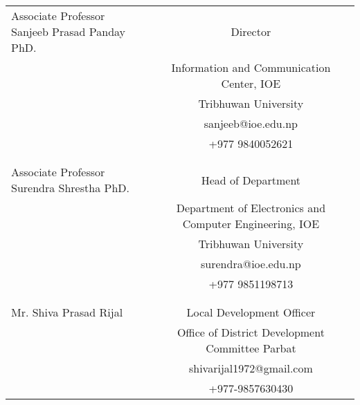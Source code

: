 
    
    \begin{tabular*}{7in}{l@{\extracolsep{\fill}}c}
        Associate Professor Sanjeeb Prasad Panday PhD. & Director \\
        & Information and Communication Center, IOE \\
        & Tribhuwan University \\
        & sanjeeb@ioe.edu.np \\
        & +977 9840052621 \\
        \\ \\
        Associate Professor Surendra Shrestha PhD. & Head of Department \\
        & Department of Electronics and Computer Engineering, IOE \\
        & Tribhuwan University \\
        & surendra@ioe.edu.np \\
        & +977 9851198713 \\
        \\ \\
        Mr. Shiva Prasad Rijal & Local Development Officer \\
        & Office of District Development Committee Parbat \\
        & shivarijal1972@gmail.com \\
        & +977-9857630430 \\
        
    \end{tabular*}
    